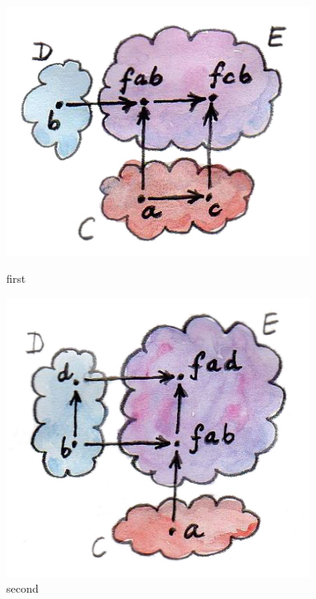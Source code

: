 \begin{figure}[H]
  \centering
  \begin{minipage}{0.45\textwidth}
      \centering
      \includegraphics[width=0.9\textwidth]{images/first.jpg} %
      \caption{first}
  \end{minipage}\hfill
  \begin{minipage}{0.45\textwidth}
      \centering
      \includegraphics[width=0.9\textwidth]{images/second.jpg} %
      \caption{second}
  \end{minipage}
\end{figure}

